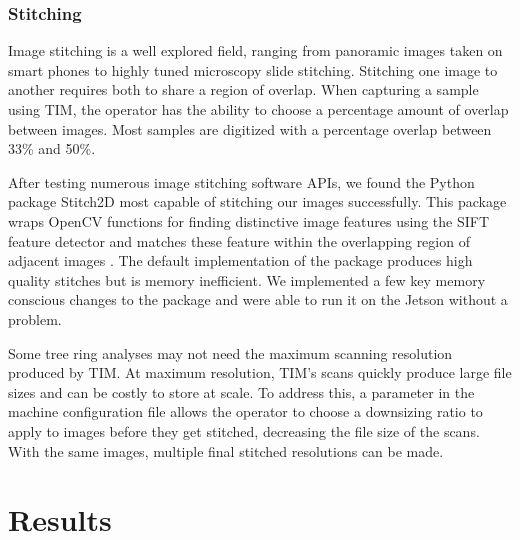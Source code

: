 \documentclass[a4paper,12pt]{article}
\begin{document}
\subsubsection{Stitching}

Image stitching is a well explored field, ranging from panoramic images taken on smart phones to highly tuned microscopy slide stitching. 
Stitching one image to another requires both to share a region of overlap. When capturing a sample using TIM, the operator has the ability to choose a percentage amount of overlap between images.
Most samples are digitized with a percentage overlap between 33\% and 50\%.

After testing numerous image stitching software APIs, we found the Python package Stitch2D most capable of stitching our images successfully. %
This package wraps OpenCV functions for finding distinctive image features using the SIFT feature detector and matches these feature within the overlapping region of adjacent images \citep{lowe_distinctive_2004}. 
The default implementation of the package produces high quality stitches but is memory inefficient. %
We implemented a few key memory conscious changes to the package and were able to run it on the Jetson without a problem. 

Some tree ring analyses may not need the maximum scanning resolution produced by TIM. At maximum resolution, TIM's scans quickly produce large file sizes and can be costly to store at scale. 
To address this, a parameter in the machine configuration file allows the operator to choose a downsizing ratio to apply to images before they get stitched, decreasing the file size of the scans.
With the same images, multiple final stitched resolutions can be made. 

\section{Results}
\end{document}
